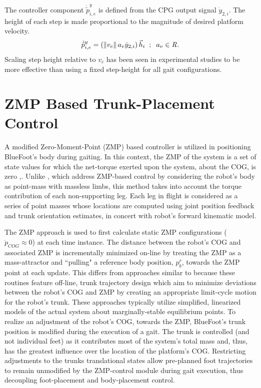 		The controller component $\dot{\tilde{p}}_{i,e}^{y}$ is defined from the CPG output signal $\dot{y}_{2,i}$. The height of each step is made proportional to the magnitude of desired platform velocity.
		\begin{equation}
			\dot{\tilde{p}}_{i,e}^{y} 	= \left( \left\lVert v_{c}\right\rVert a_{v} \dot{y}_{2,i}\right) \vec{h}_{i} 	\hspace{2mm} ; \hspace{2mm} a_{v}  \in\emph{R}^{}.
			\label{eq::FootControl}
		\end{equation}
		Scaling step height relative to $v_c$ has been seen in experimental studies to be more effective than using a fixed step-height for all gait configurations. %




	\section{ZMP Based Trunk-Placement Control}

		A  modified Zero-Moment-Point (ZMP) based controller is utilized in positioning BlueFoot's body during gaiting. In this context, the ZMP of the system is a set of state values for which the net-torque exerted upon the system, about the COG, is zero \cite{Kajita2003},\cite{Katie2009}. Unlike \cite{Takanishi1989,Kurazume2003}, which address ZMP-based control by considering the robot's body as point-mass with massless limbs, this method takes into account the torque contribution of each non-supporting leg. Each leg in flight is considered as a series of point masses whose locations are computed using joint position feedback and trunk orientation estimates, in concert with robot's forward kinematic model.
		
		The ZMP approach is used to first calculate static ZMP configurations ( \IE $\ddot{p}_{COG}\approx0$) at each time instance. The distance between the robot's COG and associated ZMP is incrementally minimized on-line by treating the ZMP as a  mass-attractor and ``pulling" a reference body position, ${p}_{b}^{r}$, towards the ZMP point at each update. This differs from approaches similar to \cite{Kurazume2003} because these routines feature off-line, trunk trajectory design which aim to minimize deviations between the robot's COG and ZMP by creating an appropriate limit-cycle motion for the robot's trunk. These approaches typically utilize simplified, linearized models of the actual system about marginally-stable equilibrium points. To realize an adjustment of the robot's COG, towards the ZMP, BlueFoot's trunk position is modified during the execution of a gait. The trunk is controlled (and not individual feet) as it contributes most of the system's total mass and, thus, has the greatest influence over the location of the platform's COG. Restricting adjustments to the trunks translational states allow pre-planned foot trajectories to remain unmodified by the ZMP-control module during gait execution, thus decoupling foot-placement and body-placement control.

